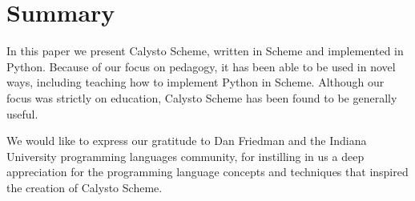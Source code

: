 \documentclass[acmsmall,screen,authorversion]{acmart}
\begin{document}
\section{Summary}

In this paper we present Calysto Scheme, written in Scheme and implemented in
Python. Because of our focus on pedagogy, it has been able to be used in novel
ways, including teaching how to implement Python in Scheme. Although our focus
was strictly on education, Calysto Scheme has been found to be generally
useful.

\begin{acks}
We would like to express our gratitude to Dan Friedman and the Indiana
University programming languages community, for instilling in us a deep
appreciation for the programming language concepts and techniques that inspired
the creation of Calysto Scheme.
\end{acks}



\end{document}
